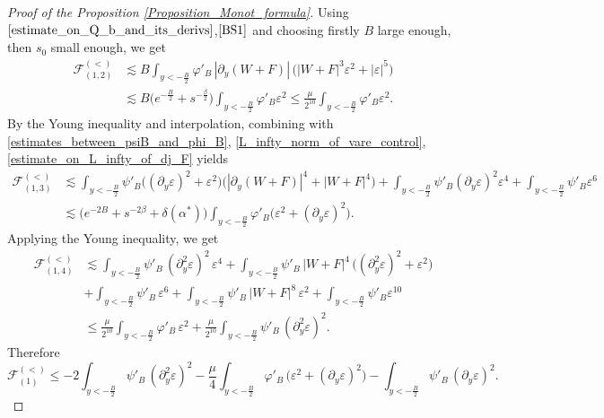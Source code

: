 \documentclass[16pt,english, oneside,reqno]{smfart}
\newcommand{\vare}{{\varepsilon}}
\newcommand{\vphi}{{\varphi}}
\begin{document}
\begin{proof}[Proof of the Proposition \ref{Proposition_Monot_formula}]
Using $\eqref{estimate_on_Q_b_and_its_derivs}$,$\eqref{BS1}$ and choosing firstly $B$ large enough, then $s_0$ small enough, we get 
\begin{equation}
    \begin{split}
        \mathcal{F}_{(1,2)}^{(<)} 
        & \lesssim B \int_{y<-\frac B2} \vphi'_B\, |\partial_y (W+F)|\, \big( |W+F|^3\vare^2 +|\vare|^5 \big)\\
        & \lesssim B\big(e^{-\frac{B}{2}} + s^{-\frac{\beta}{2}} \big) \int_{y<-\frac B2} \vphi'_B \vare^2 \leq \frac{\mu}{2^{10}}\int_{y<-\frac B2} \vphi'_B \vare^2.
    \end{split}
\end{equation}
By the Young inequality and interpolation, combining with \eqref{estimates_between_psiB_and_phi_B}, \eqref{L_infty_norm_of_vare_control}, \eqref{estimate_on_L_infty_of_dj_F} yields
\begin{equation}
    \begin{split}
        \mathcal{F}_{(1,3)}^{(<)} 
        & \lesssim\int_{y<-\frac B2} \psi'_B\big((\partial_y \vare)^2 + \vare^2 \big) \big( |\partial_y (W+F)|^4 + |W+F|^4\big) + \int_{y<-\frac B2} \psi'_B (\partial_y \vare)^2 \vare^4 + \int_{y<-\frac B2} \psi'_B \vare^6\\
        & \lesssim \big( e^{-2B} + s^{-2\beta} + \delta(\alpha^*)\big)\int_{y<-\frac B2} \vphi'_B \big( \vare^2 + (\partial_y \vare)^2\big).
    \end{split}
\end{equation}
Applying the Young inequality, we get
\begin{equation}
    \begin{split}
        \mathcal{F}_{(1,4)}^{(<)} 
        & \lesssim  \int_{y<-\frac B2} \psi'_B \, (\partial^2_y \vare)^2\,\vare^4 + \int_{y<-\frac B2} \psi'_B \,|W+F|^4\,\big((\partial^2_y \vare )^2 + \vare^2\big)\\
        & + \int_{y<-\frac B2} \psi'_B\,\vare^6 + \int_{y<-\frac B2} \psi'_B\,|W+F|^8\,\vare^2 + \int_{y<-\frac B2} \psi'_B \vare^{10}\\
        & \leq \frac{\mu}{2^{10}}\int_{y<-\frac B2} \vphi'_B\, \vare^2 + \frac{\mu}{2^{10}}\int_{y<-\frac B2} \psi'_B \,(\partial_y^2 \vare)^2.
\end{split}
\end{equation}
Therefore%
\begin{equation}\label{mathcalF_estim_onF1_on_left}
    \mathcal{F}_{(1)}^{(<)}  \leq - 2 \int_{y<-\frac B2} \psi'_B \,(\partial^2_y \vare)^2 - \frac{\mu}{4}\int_{y<-\frac B2} \vphi'_B\, \big( \vare^2+(\partial_y \vare)^2 \big) -
    \int_{y<-\frac B2} \psi'_B \, (\partial_y \vare)^2.
\end{equation}


\end{proof}
\end{document}
